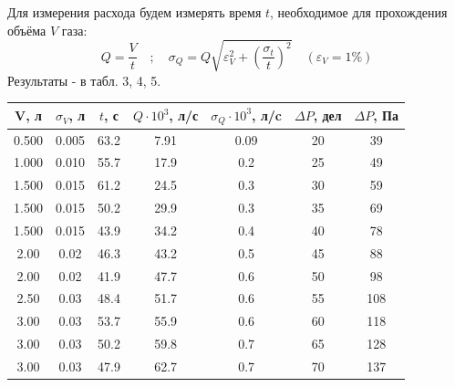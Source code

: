 \documentclass[a4paper]{article}
\begin{document}
\begin{itemize}
\noindent
Для измерения расхода будем измерять время $t$,  необходимое для прохождения объёма $V$ газа:
\[Q = \frac{V}{t} \quad ; \quad \sigma_Q = Q\sqrt{\varepsilon_V^2 + \left(\frac{\sigma_t}{t}\right)^2} \quad (\varepsilon_V = 1 \%) \]
Результаты - в табл. 3, 4, 5.
\begin{table}[]
\centering
\begin{tabular}{|c|c|c|c|c|c|c|}
\hline
V, л  & $\sigma_{V}$, л & $t$, с & $Q \cdot 10^{3}$, л/с & $\sigma_Q \cdot 10^{3}$, л/c & $\Delta P$, дел             & $\Delta P$, Па              \\ \hline
0.500 & 0.005           & 63.2   & 7.91                  & 0.09                         & \cellcolor[HTML]{00FF00}20  & \cellcolor[HTML]{00FF00}39  \\ \hline
1.000 & 0.010           & 55.7   & 17.9                  & 0.2                          & \cellcolor[HTML]{00FF00}25  & \cellcolor[HTML]{00FF00}49  \\ \hline
1.500 & 0.015           & 61.2   & 24.5                  & 0.3                          & \cellcolor[HTML]{00FF00}30  & \cellcolor[HTML]{00FF00}59  \\ \hline
1.500 & 0.015           & 50.2   & 29.9                  & 0.3                          & \cellcolor[HTML]{00FF00}35  & \cellcolor[HTML]{00FF00}69  \\ \hline
1.500 & 0.015           & 43.9   & 34.2                  & 0.4                          & \cellcolor[HTML]{00FF00}40  & \cellcolor[HTML]{00FF00}78  \\ \hline
2.00  & 0.02            & 46.3   & 43.2                  & 0.5                          & \cellcolor[HTML]{00FF00}45  & \cellcolor[HTML]{00FF00}88  \\ \hline
2.00  & 0.02            & 41.9   & 47.7                  & 0.6                          & \cellcolor[HTML]{00FF00}50  & \cellcolor[HTML]{00FF00}98  \\ \hline
2.50  & 0.03            & 48.4   & 51.7                  & 0.6                          & \cellcolor[HTML]{00FF00}55  & \cellcolor[HTML]{00FF00}108 \\ \hline
3.00  & 0.03            & 53.7   & 55.9                  & 0.6                          & \cellcolor[HTML]{00FF00}60  & \cellcolor[HTML]{00FF00}118 \\ \hline
3.00  & 0.03            & 50.2   & 59.8                  & 0.7                          & \cellcolor[HTML]{FF0000}65  & \cellcolor[HTML]{FF0000}128 \\ \hline
3.00  & 0.03            & 47.9   & 62.7                  & 0.7                          & \cellcolor[HTML]{FF0000}70  & \cellcolor[HTML]{FF0000}137 \\ \hline

\end{tabular}
\end{table}
\end{itemize}
\end{document}
